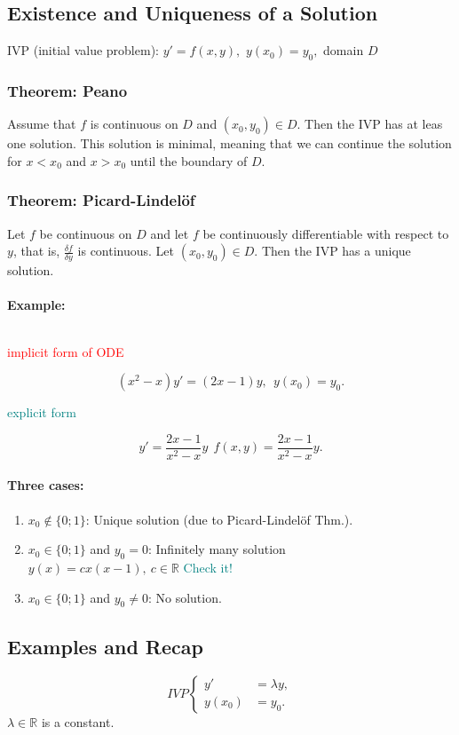 \documentclass[]{article}
\begin{document}
	\subsection{Existence and Uniqueness of a Solution}
	IVP (initial value problem): $y'=f(x,y),$ $y(x_0)=y_0,$ domain $D$
	\subsubsection{Theorem:  Peano} Assume that $f$ is continuous on $D$ and $(x_0,y_0)\in D$. Then the IVP has at leas one solution. This solution is minimal, meaning that we can continue the solution for $x <x_0$ and $x > x_0$ until the boundary of $D$.
	\subsubsection{Theorem: Picard-Lindelöf} Let $f$ be continuous on $D$ and let $f$ be continuously differentiable with respect to $y$, that is, $ \frac{\delta f}{\delta y} $ is continuous. Let $(x_0,y_0)\in D$. Then the IVP has a unique solution.
	\paragraph{Example:}$~$ 
	\begin{multicols}{2}
	\begin{center}
	\textcolor{red}{implicit form of ODE}
	\end{center}
	\[
		(x ^{2}-x)y'=(2x-1)y,~~y(x_0)=y_0
	.\]
	\begin{center}
	\textcolor{teal}{explicit form}
	\end{center}
	\[
	y'= \frac{2x-1}{x ^{2}-x}y~~f(x,y)= \frac{2x-1}{x ^{2}-x}y
	.\]
	\end{multicols}
	\paragraph{Three cases:} 
	\begin{enumerate}
		\item $x_0\not\in \{0;1\}$: Unique solution (due to Picard-Lindelöf Thm.).
		\item $x_0\in \{0;1\}$ and $y_0=0$: Infinitely many solution\\$y(x)=cx(x-1),~c\in \mathbb R$ \textcolor{teal}{ Check it!}
		\item $x_0\in \{0;1\}$ and $y_0\not=0$: No solution.
	\end{enumerate}
\subsection{Examples and Recap}
\[
	IVP
	\begin{cases} 
		y' & =\lambda y, \\
		y(x_0) & =y_0.
	\end{cases}
\]
	$\lambda\in \mathbb R$ is a constant.
\end{document}
